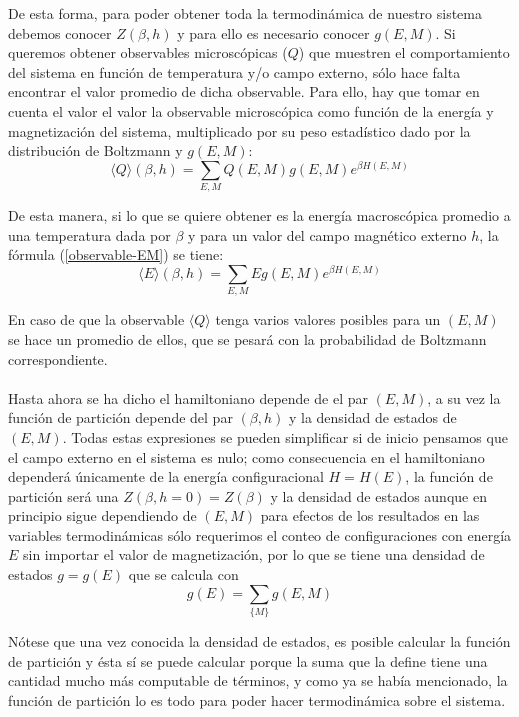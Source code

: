 \documentclass[12pt]{book}
\begin{document}
De esta forma, para poder obtener toda la termodinámica de nuestro sistema debemos 
conocer $Z(\beta,h)$ y para ello es necesario conocer $g(E,M)$.
Si queremos obtener observables microscópicas ($Q$) que muestren el comportamiento del sistema en función de temperatura y/o campo externo, sólo hace falta encontrar el valor promedio de dicha observable. Para ello, hay que tomar en cuenta el valor el valor la observable microscópica como función de la energía y magnetización del sistema, multiplicado por su peso estadístico dado por la distribución de Boltzmann y $g(E,M)$:
\begin{equation}
\label {observable-EM}
	\langle Q \rangle (\beta, h)=\sum_{E,M} Q(E,M)g(E,M)e^{\beta H(E,M)}
\end{equation}

De esta manera, si lo que se quiere obtener es la energía macroscópica promedio a una temperatura dada por $\beta$ y para un valor del campo magnético externo $h$, la fórmula (\ref{observable-EM}) se tiene:
\begin{equation}
\label {observableE}
	\langle E \rangle(\beta, h)=\sum_{E,M} E g(E,M) e^{\beta H(E,M)}
\end{equation}

En caso de que la observable $\langle Q \rangle$ tenga varios valores posibles para un $(E,M)$ se hace un promedio de ellos, que se pesará con la probabilidad de Boltzmann correspondiente.
\\
\\
Hasta ahora se ha dicho el hamiltoniano depende de el par $(E,M)$, a su vez la función de partición depende del par $(\beta,h)$ y la densidad de estados de $(E,M)$. Todas estas expresiones se pueden simplificar si de inicio pensamos que el campo externo en el sistema es nulo; como consecuencia en el hamiltoniano dependerá únicamente de la energía configuracional $H=H(E)$, la función de partición será una $Z(\beta, h=0)=Z(\beta)$ y la densidad de estados aunque en principio sigue dependiendo de $(E,M)$ para efectos de los resultados en las variables termodinámicas sólo requerimos el conteo de configuraciones con energía $E$ sin importar el valor de magnetización, por lo que se tiene una densidad de estados $g=g(E)$ que se calcula con
\begin{equation}
	g(E)=\sum_{\{M\}} g(E,M)
\end{equation}

Nótese que una vez conocida la densidad de estados, es posible calcular la función de partición y ésta sí se puede calcular porque la suma que la define tiene una cantidad mucho más computable de términos, y como ya se había mencionado, la función de partición lo es todo para poder hacer termodinámica sobre el sistema.
\end{document}
